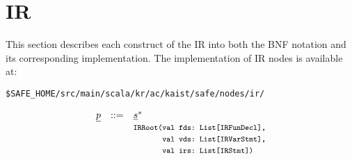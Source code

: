 \chapter{IR}
This section describes each construct of the \safe IR
into both the BNF notation and its corresponding implementation.
The implementation of IR nodes is available at:
\begin{verbatim}
$SAFE_HOME/src/main/scala/kr/ac/kaist/safe/nodes/ir/
\end{verbatim}
\small
\[
\begin{array}{llll}
\underline{p} & ::= & \underline{s}^* \\
&& \mbox{\tt\footnotesize IRRoot(val fds:~List[IRFunDecl],}\\
&&\mbox{\tt\footnotesize \phantom{IRRoot(}val vds:~List[IRVarStmt],}\\
&&\mbox{\tt\footnotesize \phantom{IRRoot(}val irs:~List[IRStmt])}\\\\


\end{array}\]
